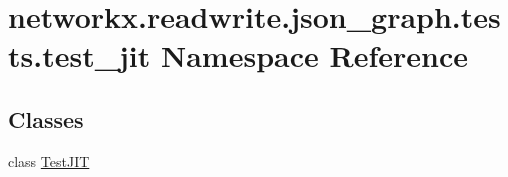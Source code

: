 \hypertarget{namespacenetworkx_1_1readwrite_1_1json__graph_1_1tests_1_1test__jit}{}\section{networkx.\+readwrite.\+json\+\_\+graph.\+tests.\+test\+\_\+jit Namespace Reference}
\label{namespacenetworkx_1_1readwrite_1_1json__graph_1_1tests_1_1test__jit}
\subsection*{Classes}
\begin{DoxyCompactItemize}
\item 
class \hyperlink{classnetworkx_1_1readwrite_1_1json__graph_1_1tests_1_1test__jit_1_1TestJIT}{Test\+J\+IT}
\end{DoxyCompactItemize}
